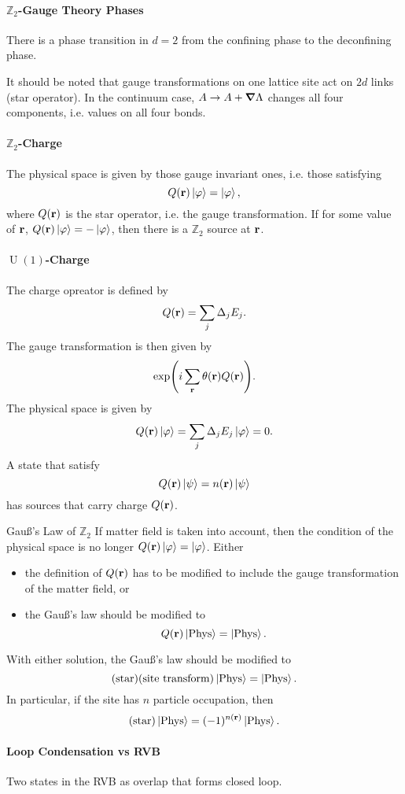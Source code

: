 \documentclass{article}
\begin{document}
\paragraph*{$\mathbb{Z}_2$-Gauge Theory Phases}
There is a phase transition in $d=2$ from the confining phase to the deconfining phase.

\par
It should be noted that gauge transformations on one lattice site act on $2d$ links (star operator).
In the continuum case, $A \rightarrow A + \grad \Lambda$ changes all four components, i.e. values on all four bonds.

\paragraph*{$\mathbb{Z}_2$-Charge}
The physical space is given by those gauge invariant ones, i.e. those satisfying
\[ Q(\vb{r}) \ket{\varphi} = \ket{\varphi}, \]
where $Q(\vb{r})$ is the star operator, i.e. the gauge transformation.
If for some value of $\vb{r}$, $Q(\vb{r})\ket{\varphi} = -\ket{\varphi}$, then there is a $\mathbb{Z}_2$ source at $\vb{r}$.

\paragraph*{$\operatorname{U}(1)$-Charge}
The charge opreator is defined by
\[ Q(\vb{r}) = \sum_j \Delta_j E_j. \]
The gauge transformation is then given by
\[ \exp(i\sum_{\vb{r}}\theta(\vb{r}) Q(\vb{r})). \]
The physical space is given by
\[ Q(\vb{r})\ket{\varphi} = \sum_j \Delta_j E_j \ket{\varphi} = 0. \]
A state that satisfy
\[ Q(\vb{r})\ket{\psi} = n(\vb{r}) \ket{\psi} \]
has sources that carry charge $Q(\vb{r})$.

\begin{example}{Gau\ss's Law of $\mathbb{Z}_2$}
    If matter field is taken into account, then the condition of the physical space is no longer $Q(\vb{r}) \ket{\varphi} = \ket{\varphi}$.
    Either
    \begin{itemize}
        \item the definition of $Q(\vb{r})$ has to be modified to include the gauge transformation of the matter field, or
        \item the Gau\ss's law should be modified to
        \[ Q(\vb{r}) \ket{\text{Phys}} = \ket{\text{Phys}}. \]
    \end{itemize}
    With either solution, the Gau\ss's law should be modified to
    \[ \qty(\text{star}) \qty(\text{site transform}) \ket{\text{Phys}} = \ket{\text{Phys}}. \]
    In particular, if the site has $n$ particle occupation, then
    \[ \qty(\text{star}) \ket{\text{Phys}} = (-1)^{n(\vb{r})} \ket{\text{Phys}}. \]
\end{example}

\paragraph*{Loop Condensation vs RVB}
Two states in the RVB as overlap that forms closed loop.

% 
% 
\end{document}
